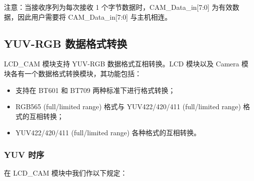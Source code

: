 \documentclass[main\_\_CN.tex]{subfiles}
\begin{document}
\begin{tiplisting}
注意：当接收序列为每次接收 1 个字节数据时，CAM\_Data\_in[7:0] 为有效数据，因此用户需要将 CAM\_Data\_in[7:0] 与主机相连。
\end{tiplisting}

\subsection{YUV-RGB 数据格式转换}
\chipname{} LCD\_CAM 模块支持 YUV-RGB 数据格式互相转换。LCD 模块以及 Camera 模块各有一个数据格式转换模块，其功能包括：
\begin{itemize}
    \item 支持在 BT601 和 BT709 两种标准下进行格式转换；
    \item RGB565 (full/limited range) 格式与 YUV422/420/411 (full/limited range) 格式的互相转换；
    \item YUV422/420/411 (full/limited range) 各种格式的互相转换。
\end{itemize}

\subsubsection{YUV 时序}
在 \chipname{} LCD\_CAM 模块中我们作以下规定：
\end{document}

